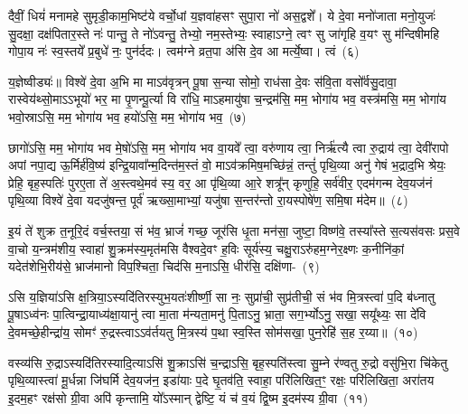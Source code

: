 {\anuvakamend[{मा॒ योनि॑रसि त्रि॒ꣳ॒शच्च॑}]}%

दैवीं॒ धियं॑ मनामहे सुमृडी॒काम॒भिष्ट॑ये वर्चो॒धां य॒ज्ञवा॑हसꣳ सुपा॒रा नो॑ अस॒द्वशे᳚। ये दे॒वा मनो॑जाता मनो॒युजः॑ सु॒दक्षा॒ दक्ष॑पितार॒स्ते नः॑ पान्तु॒ ते नो॑\-ऽवन्तु॒ तेभ्यो॒ नम॒स्तेभ्यः॒ स्वाहा\-ऽग्ने॒ त्वꣳ सु जा॑गृहि व॒यꣳ सु म॑न्दिषीमहि गोपा॒य नः॑ स्व॒स्तये᳚ प्र॒बुधे॑ नः॒ पुन॑र्ददः। त्वम॑ग्ने व्रत॒पा अ॑सि दे॒व आ मर्त्ये॒ष्वा। त्वं~(६)

य॒ज्ञेष्वीड्यः॑॥ विश्वे॑ दे॒वा अ॒भि मा मा\-ऽव॑वृत्रन् पू॒षा स॒न्या सोमो॒ राध॑सा दे॒वः स॑वि॒ता वसो᳚र्वसु॒दावा॒ रास्वेय॑थ्सो॒मा\-ऽऽ\-भूयो॑ भर॒ मा पृ॒णन्पू॒र्त्या वि रा॑धि॒ मा\-ऽहमायु॑षा च॒न्द्रम॑सि॒ मम॒ भोगा॑य भव॒ वस्त्र॑मसि॒ मम॒ भोगा॑य भवो॒स्रा\-ऽसि॒ मम॒ भोगा॑य भव॒ हयो॑\-ऽसि॒ मम॒ भोगा॑य भव॒~(७)

छागो॑\-ऽसि॒ मम॒ भोगा॑य भव मे॒षो॑\-ऽसि॒ मम॒ भोगा॑य भव वा॒यवे᳚ त्वा॒ वरु॑णाय त्वा॒ निर्\mbox{}ऋ॑त्यै त्वा रु॒द्राय॑ त्वा॒ देवी॑रापो अपां नपा॒द्य ऊ॒र्मिर्\mbox{}ह॑वि॒ष्य॑ इन्द्रि॒यावा᳚न्म॒दिन्त॑म॒स्तं वो॒ मा\-ऽव॑क्रमिष॒मच्छि॑न्नं॒ तन्तुं॑ पृथि॒व्या अनु॑ गेषं भ॒द्राद॒भि श्रेयः॒ प्रेहि॒ बृह॒स्पतिः॑ पुरए॒ता ते॑ अ॒स्त्वथे॒मव॑ स्य॒ वर॒ आ पृ॑थि॒व्या आ॒रे शत्रू᳚न् कृणुहि॒ सर्व॑वीर॒ एदम॑गन्म देव॒यज॑नं पृथि॒व्या विश्वे॑ दे॒वा यदजु॑षन्त॒ पूर्व॑ ऋख्सा॒माभ्यां॒ यजु॑षा स॒न्तर॑न्तो रा॒यस्पोषे॑ण॒ समि॒षा म॑देम॥~(८)

{\anuvakamend[{आ त्वꣳ हयो॑\-ऽसि॒ मम॒ भोगा॑य भव स्य॒ पञ्च॑विꣳशतिश्च}]}%

इ॒यं ते॑ शुक्र त॒नूरि॒दं वर्च॒स्तया॒ सं भ॑व॒ भ्राजं॑ गच्छ॒ जूर॑सि धृ॒ता मन॑सा॒ जुष्टा॒ विष्ण॑वे॒ तस्या᳚स्ते स॒त्यस॑वसः प्रस॒वे वा॒चो य॒न्त्रम॑शीय॒ स्वाहा॑ शु॒क्रम॑स्य॒मृत॑मसि वैश्वदे॒वꣳ ह॒विः सूर्य॑स्य॒ चक्षु॒रा\-ऽरु॑हम॒ग्नेर॒क्ष्णः क॒नीनि॑कां॒ यदेत॑शेभि॒रीय॑से॒ भ्राज॑मानो विप॒श्चिता॒ चिद॑सि म॒ना\-ऽसि॒ धीर॑सि॒ दक्षि॑णा-~(९)

ऽसि य॒ज्ञिया॑\-ऽसि क्ष॒त्रिया॒\-ऽस्यदि॑तिरस्युभ॒यतः॑शीर्ष्णी॒ सा नः॒ सुप्रा॑ची॒ सुप्र॑तीची॒ सं भ॑व मि॒त्रस्त्वा॑ प॒दि ब॑ध्नातु पू॒षा\-ऽध्व॑नः पा॒त्विन्द्रा॒याध्य॑क्षा॒यानु॑ त्वा मा॒ता म॑न्यता॒मनु॑ पि॒ता\-ऽनु॒ भ्राता॒ सग॒र्भ्यो\-ऽनु॒ सखा॒ सयू᳚थ्यः॒ सा दे॑वि दे॒वमच्छे॒हीन्द्रा॑य॒ सोमꣳ॑ रु॒द्रस्त्वा\-ऽऽ\-व॑र्तयतु मि॒त्रस्य॑ प॒था स्व॒स्ति सोम॑सखा॒ पुन॒रेहि॑ स॒ह र॒य्या॥~(१०)

{\anuvakamend[{दक्षि॑णा॒ सोम॑सखा॒ पञ्च॑ च}]}%

वस्व्य॑सि रु॒द्रा\-ऽस्यदि॑तिरस्यादि॒त्या\-ऽसि॑ शु॒क्रा\-ऽसि॑ च॒न्द्रा\-ऽसि॒ बृह॒स्पति॑स्त्वा सु॒म्ने र॑ण्वतु रु॒द्रो वसु॑भि॒रा चि॑केतु पृथि॒व्यास्त्वा॑ मू॒र्धन्ना जि॑घर्मि देव॒यज॑न॒ इडा॑याः प॒दे घृ॒तव॑ति॒ स्वाहा॒ परि॑लिखित॒ꣳ॒ रक्षः॒ परि॑लिखिता॒ अरा॑तय इ॒दम॒हꣳ रक्ष॑सो ग्री॒वा अपि॑ कृन्तामि॒ यो᳚\-ऽस्मान् द्वेष्टि॒ यं च॑ व॒यं द्वि॒ष्म इ॒दम॑स्य ग्री॒वा~(११)

